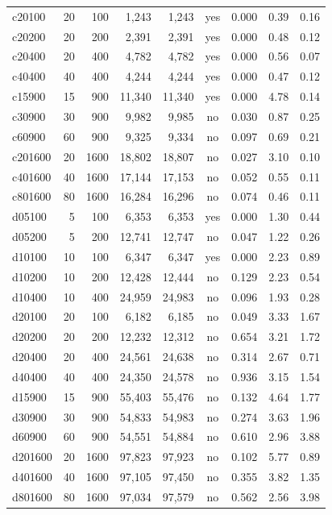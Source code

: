 \documentclass[11pt,a4paper]{article}
\begin{document}
\begin{table}[H]
\begin{tabular}{l r r r r c r r r}
c20100 & 20 & 100 & 1,243 & 1,243 & yes & 0.000 & 0.39 & 0.16 \\
c20200 & 20 & 200 & 2,391 & 2,391 & yes & 0.000 & 0.48 & 0.12 \\
c20400 & 20 & 400 & 4,782 & 4,782 & yes & 0.000 & 0.56 & 0.07 \\
c40400 & 40 & 400 & 4,244 & 4,244 & yes & 0.000 & 0.47 & 0.12 \\
c15900 & 15 & 900 & 11,340 & 11,340 & yes & 0.000 & 4.78 & 0.14 \\
c30900 & 30 & 900 & 9,982 & 9,985 & no & 0.030 & 0.87 & 0.25 \\
c60900 & 60 & 900 & 9,325 & 9,334 & no & 0.097 & 0.69 & 0.21 \\
c201600 & 20 & 1600 & 18,802 & 18,807 & no & 0.027 & 3.10 & 0.10 \\
c401600 & 40 & 1600 & 17,144 & 17,153 & no & 0.052 & 0.55 & 0.11 \\
c801600 & 80 & 1600 & 16,284 & 16,296 & no & 0.074 & 0.46 & 0.11 \\
\midrule
d05100 & 5 & 100 & 6,353 & 6,353 & yes & 0.000 & 1.30 & 0.44 \\
d05200 & 5 & 200 & 12,741 & 12,747 & no & 0.047 & 1.22 & 0.26 \\
d10100 & 10 & 100 & 6,347 & 6,347 & yes & 0.000 & 2.23 & 0.89 \\
d10200 & 10 & 200 & 12,428 & 12,444 & no & 0.129 & 2.23 & 0.54 \\
d10400 & 10 & 400 & 24,959 & 24,983 & no & 0.096 & 1.93 & 0.28 \\
d20100 & 20 & 100 & 6,182 & 6,185 & no & 0.049 & 3.33 & 1.67 \\
d20200 & 20 & 200 & 12,232 & 12,312 & no & 0.654 & 3.21 & 1.72 \\
d20400 & 20 & 400 & 24,561 & 24,638 & no & 0.314 & 2.67 & 0.71 \\
d40400 & 40 & 400 & 24,350 & 24,578 & no & 0.936 & 3.15 & 1.54 \\
d15900 & 15 & 900 & 55,403 & 55,476 & no & 0.132 & 4.64 & 1.77 \\
d30900 & 30 & 900 & 54,833 & 54,983 & no & 0.274 & 3.63 & 1.96 \\
d60900 & 60 & 900 & 54,551 & 54,884 & no & 0.610 & 2.96 & 3.88 \\
d201600 & 20 & 1600 & 97,823 & 97,923 & no & 0.102 & 5.77 & 0.89 \\
d401600 & 40 & 1600 & 97,105 & 97,450 & no & 0.355 & 3.82 & 1.35 \\
d801600 & 80 & 1600 & 97,034 & 97,579 & no & 0.562 & 2.56 & 3.98 \\

\end{tabular}
\end{table}
\end{document}

